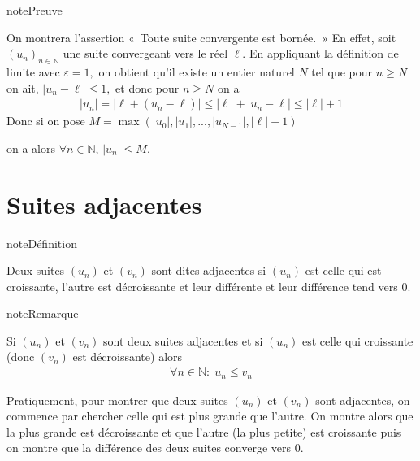 \documentclass[letterpaper,10pt,french]{jupyterBook}
\begin{document}
\begin{sphinxadmonition}{note}{Preuve}

\sphinxAtStartPar
On montrera l’assertion « Toute suite convergente est bornée. » En effet, soit \((u_n)_{n\in \mathbb{N}}\) une suite convergeant vers le réel \(\ell.\) En appliquant la définition de limite avec \(\varepsilon=1,\)  on obtient qu’il existe un entier naturel \(N\) tel que pour \(n\geq N\) on ait, \(|u_n-\ell|\leq1,\) et donc pour \(n\geq N\) on a
\begin{equation*}
\begin{split}
|u_n|=|\ell+(u_n-\ell)|\leq |\ell|+|u_n-\ell|\leq |\ell|+1
\end{split}
\end{equation*}
\sphinxAtStartPar
Donc si on pose \(M=\max(|u_0|,|u_1|,...,|u_{N-1}|,|\ell|+1)\)

\sphinxAtStartPar
on a alors \(\forall n\in \mathbb{N},\,|u_n|\leq M.\)
\end{sphinxadmonition}


\section{Suites adjacentes}
\label{\detokenize{suites:suites-adjacentes}}
\begin{sphinxadmonition}{note}{Définition}

\sphinxAtStartPar
Deux suites \((u_n)\) et \((v_n)\) sont dites adjacentes si \((u_n)\) est celle qui est croissante, l’autre est décroissante et leur différente et leur différence tend vers 0.
\end{sphinxadmonition}

\begin{sphinxadmonition}{note}{Remarque}

\sphinxAtStartPar
Si \((u_n)\) et \((v_n)\) sont deux suites adjacentes et si \((u_n)\) est celle qui croissante (donc \((v_n)\) est décroissante) alors
\begin{equation*}
\begin{split}
\forall n\in \mathbb{N}:\; u_n\leq v_n
\end{split}
\end{equation*}\end{sphinxadmonition}

\sphinxAtStartPar
Pratiquement, pour montrer que deux suites \((u_n)\) et \((v_n)\) sont adjacentes, on commence par chercher celle qui est plus grande que l’autre. On montre alors que la plus grande est décroissante et que l’autre (la plus petite) est croissante puis on montre que la différence des deux suites converge vers 0.
\end{document}
